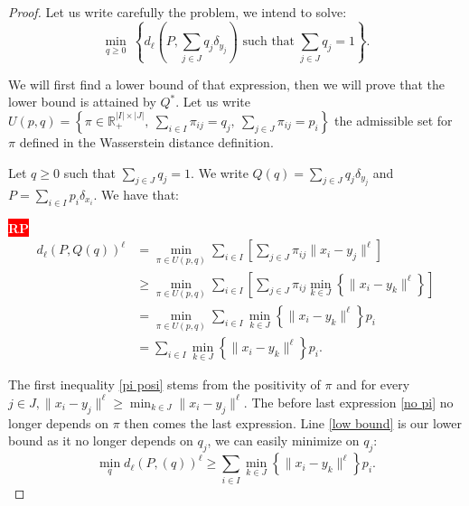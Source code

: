 \documentclass{amsart}
\newcommand{\nb}[3]{
		{\colorbox{#2}{\bfseries\sffamily\tiny\textcolor{white}{#1}}}
		{\textcolor{#2}{\text{$\blacktriangleright$}{\textcolor{#2}{#3}}\text{$\blacktriangleleft$}}}}
\newcommand{\rp}[1]{\nb{RP}{red}{#1}}
\newcommand{\RR}{\mathbb{R}}
\begin{document}
\begin{proof}
Let us write carefully the problem, we intend to solve:
$$
    \min_{q\geq0}\:\left\{d_\ell\left(P,\sum_{j\in J}q_j\delta_{y_j}\right)\text{ such that} \;\sum_{j\in J}q_j=1 \right\}.
$$

We will first find a lower bound of that expression, then we will prove that the lower bound is attained by $Q^*$. Let us write $U\left(p,q\right)=\left\{\pi\in\RR^{\lvert I\rvert\times\lvert J\rvert}_+,\: \sum_{i\in I}\pi_{ij}=q_j,\:\sum_{j\in J}\pi_{ij}=p_i\right\}$ the admissible set for $\pi$ defined in the Wasserstein distance definition.
\newline
    
Let $q\geq 0$ such that $\sum_{j\in J}q_j=1$. We write $Q\left(q\right)=\sum_{j\in J}q_j\delta_{y_j}$ and $P=\sum_{i\in I}p_i\delta_{x_i}$. We have that:
\rp{numérotation}
\begin{align}
    d_\ell\left(P,Q\left(q\right)\right)^\ell&= \min_{\pi\in U\left(p,q\right)}\sum_{i\in I}\left[\sum_{j\in J}\pi_{ij}\lVert x_i-y_j\rVert^\ell\right] \nonumber \\
    &\geq \min_{\pi\in U\left(p,q\right)}\sum_{i\in I}\left[\sum_{j\in J}\pi_{ij}\min_{k\in J}\left\{\lVert x_i-y_k\lVert^\ell\right\}\right] \label{pi posi} \\ &= \min_{\pi\in U\left(p,q\right)}\sum_{i\in I}\min_{k\in J}\left\{\lVert x_i-y_k\lVert^\ell\right\}p_i \label{no pi}
    \\& =\sum_{i\in I}\min_{k\in J}\left\{\lVert x_i-y_k\lVert^\ell\right\}p_i. \label{low bound}
\end{align}
    
The first inequality \ref{pi posi} stems from the positivity of $\pi$ and for every $j\in J, \lVert x_i-y_j\rVert^\ell \geq \min_{k\in J}\lVert x_i-y_j\rVert^\ell$. The before last expression \ref{no pi} no longer depends on $\pi$ then comes the last expression. Line \ref{low bound} is our lower bound as it no longer depends on $q_j$, we can easily minimize on $q_j$:
\begin{equation}\label{lower}\min_{q}d_\ell\left(P,\left(q\right)\right)^\ell\geq\sum_{i\in I}\min_{k\in J}\left\{\lVert x_i-y_k\lVert^\ell\right\}p_i.
\end{equation}


\end{proof}
\end{document}
